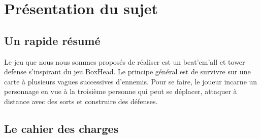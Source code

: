 \section{Présentation du sujet} %

\subsection{Un rapide résumé}
Le jeu que nous nous sommes proposés de réaliser est un beat’em’all et tower defense s’inspirant du jeu BoxHead. Le
principe général est de survivre sur une carte à plusieurs vagues successives d’ennemis. Pour se faire,
le joueur incarne un personnage en vue à la troisième personne qui peut se déplacer, attaquer à distance avec des sorts 
et construire des défenses.

\subsection{Le cahier des charges}

